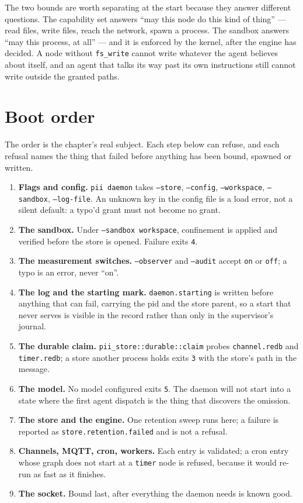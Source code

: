 The two bounds are worth separating at the start because they answer different questions. The
capability set answers ``may this node do this kind of thing'' --- read files, write files,
reach the network, spawn a process. The sandbox answers ``may this process, at all'' --- and
it is enforced by the kernel, after the engine has decided. A node without \texttt{fs\_write}
cannot write whatever the agent believes about itself, and an agent that talks its way past
its own instructions still cannot write outside the granted paths.

\section{Boot order}

The order is the chapter's real subject. Each step below can refuse, and each refusal names
the thing that failed before anything has been bound, spawned or written.

\begin{enumerate}
	\item \textbf{Flags and config.} \texttt{pii daemon} takes \texttt{--store},
	\texttt{--config}, \texttt{--workspace}, \texttt{--sandbox}, \texttt{--log-file}. An
	unknown key in the config file is a load error, not a silent default: a typo'd grant must
	not become no grant.
	\item \textbf{The sandbox.} Under \texttt{--sandbox workspace}, confinement is applied and
	verified before the store is opened. Failure exits \texttt{4}.
	\item \textbf{The measurement switches.} \texttt{--observer} and \texttt{--audit} accept
	\texttt{on} or \texttt{off}; a typo is an error, never ``on''.
	\item \textbf{The log and the starting mark.} \texttt{daemon.starting} is written before
	anything that can fail, carrying the pid and the store parent, so a start that never serves
	is visible in the record rather than only in the supervisor's journal.
	\item \textbf{The durable claim.} \texttt{pii\_store::durable::claim} probes
	\texttt{channel.redb} and \texttt{timer.redb}; a store another process holds exits
	\texttt{3} with the store's path in the message.
	\item \textbf{The model.} No model configured exits \texttt{5}. The daemon will not start
	into a state where the first agent dispatch is the thing that discovers the omission.
	\item \textbf{The store and the engine.} One retention sweep runs here; a failure is
	reported as \texttt{store.retention.failed} and is not a refusal.
	\item \textbf{Channels, MQTT, cron, workers.} Each entry is validated; a cron entry whose
	graph does not start at a \texttt{timer} node is refused, because it would re-run as fast
	as it finishes.
	\item \textbf{The socket.} Bound last, after everything the daemon needs is known good.
\end{enumerate}

